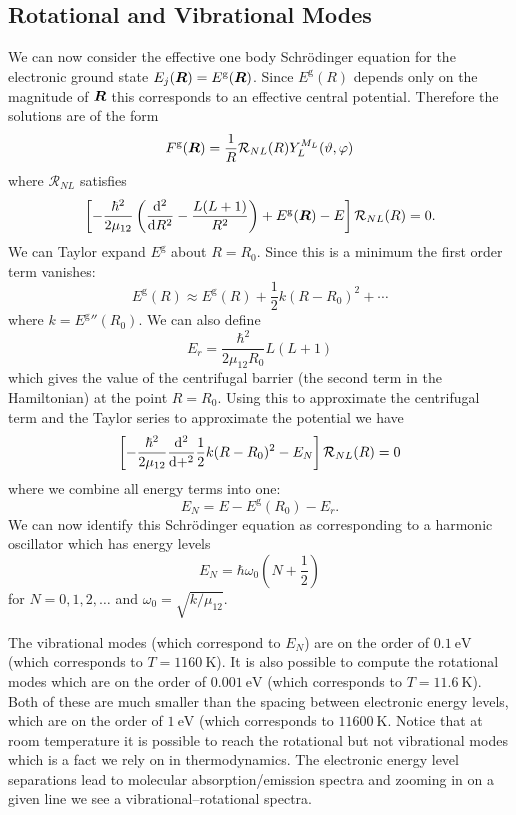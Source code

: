 \documentclass[a4paper]{article}
\newcommand{\gerade}{\mathrm{g}}
\begin{document}
    \subsection{Rotational and Vibrational Modes}
    We can now consider the effective one body Schr\"odinger equation for the electronic ground state \(E_j(\vv{R}) = E^{\gerade}(\vv{R})\).
    Since \(E^{\gerade}(R)\) depends only on the magnitude of \(\bm{R}\) this corresponds to an effective central potential.
    Therefore the solutions are of the form
    \[F^{\gerade}(\vv{R}) = \frac{1}{R}\mathcal{R}_{NL}(R)Y_{L}^{M_L}(\vartheta, \varphi)\]
    where \(\mathcal{R}_{NL}\) satisfies
    \[\left[ -\frac{\hbar^2}{2\mu_{12}}\left( \dv[2]{R} - \frac{L(L + 1)}{R^2} \right) + E^{\gerade}(\vv{R}) - E \right]\mathcal{R}_{NL}(R) = 0.\]
    We can Taylor expand \(E^{\gerade}\) about \(R = R_0\).
    Since this is a minimum the first order term vanishes:
    \[E^{\gerade}(R) \approx E^{\gerade}(R) + \frac{1}{2}k(R - R_0)^2 + \dotsb\]
    where \(k = E^{\gerade}{''}(R_0)\).
    We can also define
    \[E_r = \frac{\hbar^2}{2\mu_{12}R_0}L(L + 1)\]
    which gives the value of the centrifugal barrier (the second term in the Hamiltonian) at the point \(R = R_0\).
    Using this to approximate the centrifugal term and the Taylor series to approximate the potential we have
    \[\left[ -\frac{\hbar^2}{2\mu_{12}}\dv[2] + \frac{1}{2}k(R - R_0)^2 - E_N \right]\mathcal{R}_{NL}(R) = 0\]
    where we combine all energy terms into one:
    \[E_N = E - E^{\gerade}(R_0) - E_r.\]
    We can now identify this Schr\"odinger equation as corresponding to a harmonic oscillator which has energy levels
    \[E_N = \hbar\omega_0\left( N + \frac{1}{2} \right)\]
    for \(N = 0, 1, 2, \dotsc\) and \(\omega_0 = \sqrt{k/\mu_{12}}\).
    
    The vibrational modes (which correspond to \(E_N\)) are on the order of \(\SI{0.1}{\electronvolt}\) (which corresponds to \(T = \SI{1160}{\kelvin}\)).
    It is also possible to compute the rotational modes which are on the order of \(\SI{0.001}{\electronvolt}\) (which corresponds to \(T = \SI{11.6}{\kelvin}\)).
    Both of these are much smaller than the spacing between electronic energy levels, which are on the order of \(\SI{1}{\electronvolt}\) (which corresponds to \(\SI{11600}{\kelvin}\).
    Notice that at room temperature it is possible to reach the rotational but not vibrational modes which is a fact we rely on in thermodynamics.
    The electronic energy level separations lead to molecular absorption/emission spectra and zooming in on a given line we see a vibrational--rotational spectra.
    
\end{document}
